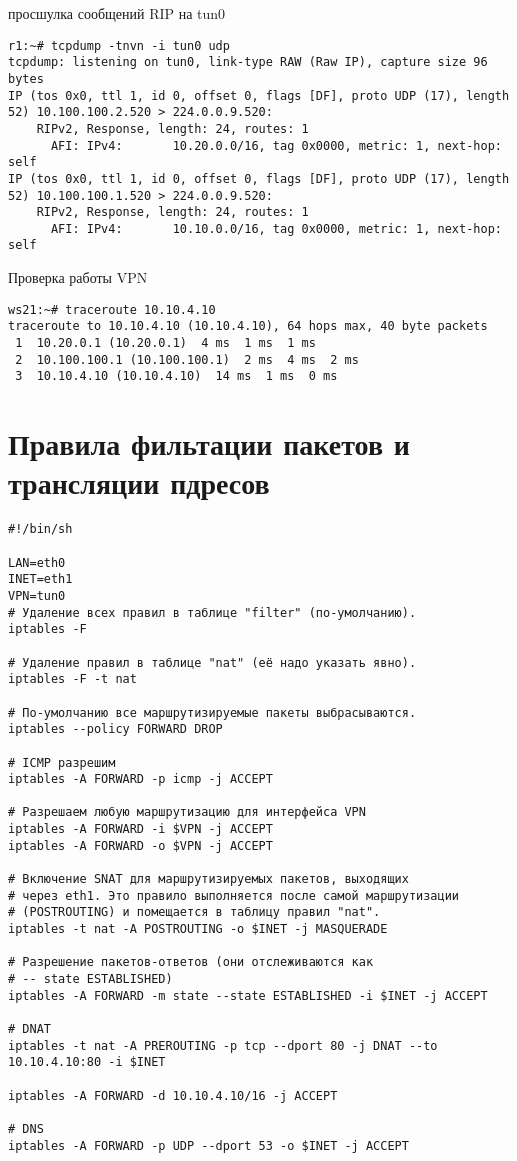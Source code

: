 \documentclass[a4paper,12pt]{article}
\begin{document}
просшулка сообщений RIP на tun0

\begin{Verbatim}
r1:~# tcpdump -tnvn -i tun0 udp
tcpdump: listening on tun0, link-type RAW (Raw IP), capture size 96 bytes
IP (tos 0x0, ttl 1, id 0, offset 0, flags [DF], proto UDP (17), length 52) 10.100.100.2.520 > 224.0.0.9.520: 
	RIPv2, Response, length: 24, routes: 1
	  AFI: IPv4:       10.20.0.0/16, tag 0x0000, metric: 1, next-hop: self
IP (tos 0x0, ttl 1, id 0, offset 0, flags [DF], proto UDP (17), length 52) 10.100.100.1.520 > 224.0.0.9.520: 
	RIPv2, Response, length: 24, routes: 1
	  AFI: IPv4:       10.10.0.0/16, tag 0x0000, metric: 1, next-hop: self
\end{Verbatim}

Проверка работы VPN

\begin{Verbatim}
ws21:~# traceroute 10.10.4.10
traceroute to 10.10.4.10 (10.10.4.10), 64 hops max, 40 byte packets
 1  10.20.0.1 (10.20.0.1)  4 ms  1 ms  1 ms
 2  10.100.100.1 (10.100.100.1)  2 ms  4 ms  2 ms
 3  10.10.4.10 (10.10.4.10)  14 ms  1 ms  0 ms
\end{Verbatim}

\section{Правила фильтации пакетов и трансляции пдресов}

\begin{Verbatim}
#!/bin/sh

LAN=eth0
INET=eth1
VPN=tun0
# Удаление всех правил в таблице "filter" (по-умолчанию).
iptables -F

# Удаление правил в таблице "nat" (её надо указать явно).
iptables -F -t nat

# По-умолчанию все маршрутизируемые пакеты выбрасываются.
iptables --policy FORWARD DROP

# ICMP разрешим
iptables -A FORWARD -p icmp -j ACCEPT

# Разрешаем любую маршрутизацию для интерфейса VPN
iptables -A FORWARD -i $VPN -j ACCEPT
iptables -A FORWARD -o $VPN -j ACCEPT

# Включение SNAT для маршрутизируемых пакетов, выходящих
# через eth1. Это правило выполняется после самой маршрутизации
# (POSTROUTING) и помещается в таблицу правил "nat".
iptables -t nat -A POSTROUTING -o $INET -j MASQUERADE

# Разрешение пакетов-ответов (они отслеживаются как
# -- state ESTABLISHED)
iptables -A FORWARD -m state --state ESTABLISHED -i $INET -j ACCEPT

# DNAT
iptables -t nat -A PREROUTING -p tcp --dport 80 -j DNAT --to 10.10.4.10:80 -i $INET

iptables -A FORWARD -d 10.10.4.10/16 -j ACCEPT

# DNS
iptables -A FORWARD -p UDP --dport 53 -o $INET -j ACCEPT
\end{Verbatim}
\end{document}
